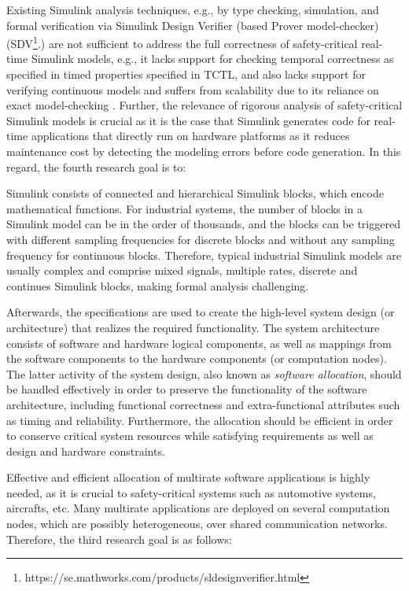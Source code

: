 Existing  Simulink analysis techniques, e.g., by type checking, simulation, and formal verification via Simulink Design Verifier (based Prover model-checker) (SDV\footnote{https://se.mathworks.com/products/sldesignverifier.html}.) are not sufficient to address the full correctness of safety-critical real-time Simulink models, e.g., it lacks support for checking temporal correctness as specified in timed properties specified in TCTL, and also lacks support for verifying continuous models and suffers from scalability due to its reliance on exact model-checking \cite{Leitner2008SimulinkStudy}. Further, the relevance of rigorous analysis of safety-critical Simulink models is crucial as it is the case that Simulink generates code for real-time applications that directly run on hardware platforms as it reduces maintenance cost by detecting the modeling errors before code generation. In this regard, the fourth research goal is to:
\begin{researchgoal}
\end{researchgoal}

Simulink consists of connected and hierarchical Simulink blocks, which encode mathematical functions. For industrial systems, the number of blocks in a Simulink model can be in the order of thousands, and the blocks can be triggered with different sampling frequencies for discrete blocks and without any sampling frequency 
for continuous blocks. Therefore, typical industrial Simulink models are usually complex and comprise mixed signals, multiple rates, discrete and continues Simulink blocks, making formal analysis challenging.

Afterwards, the specifications are used to create the high-level system design (or architecture) that realizes the required functionality. The system architecture consists of software and hardware logical components, as well as mappings from the software components to the hardware components (or computation nodes). The latter activity of the system design, also known as \textit{software allocation}, should be handled effectively in order to preserve the functionality of the software architecture, including functional correctness and extra-functional attributes such as timing and reliability. Furthermore, the allocation should be efficient in order to conserve critical system resources while satisfying requirements as well as design and hardware constraints.

Effective and efficient allocation of multirate software applications is highly needed, as it is crucial to safety-critical systems such as automotive systems, aircrafts, etc. Many multirate applications are deployed on several computation nodes, which are possibly heterogeneous, over shared communication networks. Therefore, the third research goal is as follows:
 
